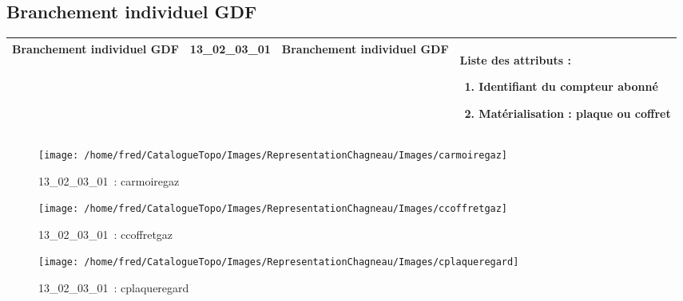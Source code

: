 \documentclass[12pt,titlepage]{book}
\begin{document}
\subsection{Branchement individuel GDF}
\noindent
\vspace{\baselineskip}

\renewcommand{\arraystretch}{1.2}
\begin{supertabular}{|p{10cm}|c|p{13cm}|p{12cm}|}
 Branchement individuel GDF & 13\_02\_03\_01 & Branchement individuel GDF & Liste des attributs :
\begin{enumerate}
  \item Identifiant du compteur abonné  \item Matérialisation : plaque ou coffret\end{enumerate}
\\
\hline
\end{supertabular}
\begin{figure}[h!]
  \hfill         %
  \begin{minipage}[t]{3cm}
    \begin{center}
      \texttt{[image: /home/fred/CatalogueTopo/Images/RepresentationChagneau/Images/carmoiregaz]}
      \caption[~13\_02\_03\_01]{\small{13\_02\_03\_01~:} \tiny{carmoiregaz}}\label{carmoiregaz}
    \end{center}
  \end{minipage}
  \begin{minipage}[t]{3cm}
    \begin{center}
      \texttt{[image: /home/fred/CatalogueTopo/Images/RepresentationChagneau/Images/ccoffretgaz]}
      \caption[~13\_02\_03\_01]{\small{13\_02\_03\_01~:} \tiny{ccoffretgaz}}\label{ccoffretgaz}
    \end{center}
  \end{minipage}
  \begin{minipage}[t]{3cm}
    \begin{center}
      \texttt{[image: /home/fred/CatalogueTopo/Images/RepresentationChagneau/Images/cplaqueregard]}
      \caption[~13\_02\_03\_01]{\small{13\_02\_03\_01~:} \tiny{cplaqueregard}}\label{cplaqueregard}
    \end{center}
  \end{minipage}
\end{figure}
\end{document}
